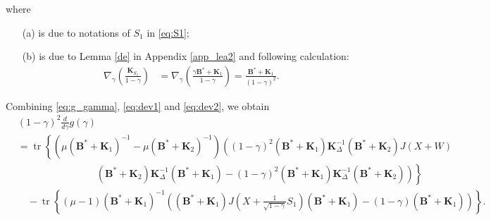 \documentclass[journal,final, onecolumn]{IEEEtran}
\DeclareMathOperator{\tr}{tr}
\begin{document}
where
\begin{enumerate}
\item [(a)] is due to notations of $S_1$ in \eqref{eq:S1};
\item [(b)] is due to Lemma \ref{de} in Appendix \ref{app_lea2} and following calculation:
\begin{align}
\nabla_\gamma \left(   \frac{\boldsymbol{K}_{S_1}}{1-\gamma}  \right)  &= \nabla_\gamma \left(   \frac{\gamma \boldsymbol{B}^{*}+\boldsymbol{K}_{1}}{1-\gamma}  \right) = \frac{\boldsymbol{B}^{*}+\boldsymbol{K}_{1}}{(1-\gamma)^{2}}.
\end{align}
\end{enumerate}

Combining \eqref{eq:g_gamma}, \eqref{eq:dev1} and \eqref{eq:dev2}, we obtain
\begin{align}
& (1-\gamma)^2 \frac{d}{d\gamma}g(\gamma)\nonumber \\
& = \tr \left\{  \left(     \mu (\boldsymbol{B}^{*} + \boldsymbol{K}_{1})^{-1} - \mu (\boldsymbol{B}^{*} + \boldsymbol{K}_{2})^{-1}  \right) \left(   (1-\gamma)^{2}    (\boldsymbol{B}^{*} + \boldsymbol{K}_{1}) \boldsymbol{K}^{-1}_{\Delta}(\boldsymbol{B}^{*} + \boldsymbol{K}_{2}) J(X+W) \right.\right.\nonumber \\
& \qquad \qquad \qquad \qquad \left.\left.(\boldsymbol{B}^{*} + \boldsymbol{K}_{2}) \boldsymbol{K}^{-1}_{\Delta}(\boldsymbol{B}^{*} + \boldsymbol{K}_{1})  -(1-\gamma)^{2}(\boldsymbol{B}^{*} + \boldsymbol{K}_{1}) \boldsymbol{K}^{-1}_{\Delta}(\boldsymbol{B}^{*} + \boldsymbol{K}_{2})     \right)         \right\}\nonumber\\
& \quad - \tr \left\{   (\mu-1)  (\boldsymbol{B}^{*}+\boldsymbol{K}_{1})^{-1} \left( {(\boldsymbol{B}^{*}+\boldsymbol{K}_{1})}        J\left(X+\frac{1}{\sqrt{1-\gamma}}S_{1}\right)  {(\boldsymbol{B}^{*}+\boldsymbol{K}_{1})} - {(1-\gamma)} (\boldsymbol{B}^{*}+\boldsymbol{K}_{1})                    \right)    \right\}. \label{eq:low}
\end{align}
\end{document}
